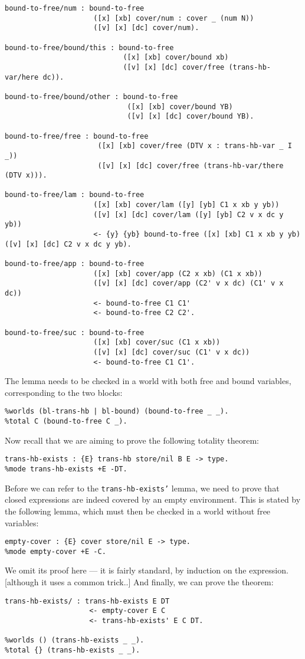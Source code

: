 \begin{verbatim}
bound-to-free/num : bound-to-free
                     ([x] [xb] cover/num : cover _ (num N))
                     ([v] [x] [dc] cover/num).

bound-to-free/bound/this : bound-to-free
                            ([x] [xb] cover/bound xb)
                            ([v] [x] [dc] cover/free (trans-hb-var/here dc)).

bound-to-free/bound/other : bound-to-free
                             ([x] [xb] cover/bound YB)
                             ([v] [x] [dc] cover/bound YB).

bound-to-free/free : bound-to-free
                      ([x] [xb] cover/free (DTV x : trans-hb-var _ I _))
                      ([v] [x] [dc] cover/free (trans-hb-var/there (DTV x))).

bound-to-free/lam : bound-to-free
                     ([x] [xb] cover/lam ([y] [yb] C1 x xb y yb))
                     ([v] [x] [dc] cover/lam ([y] [yb] C2 v x dc y yb))
                     <- {y} {yb} bound-to-free ([x] [xb] C1 x xb y yb) ([v] [x] [dc] C2 v x dc y yb).

bound-to-free/app : bound-to-free
                     ([x] [xb] cover/app (C2 x xb) (C1 x xb))
                     ([v] [x] [dc] cover/app (C2' v x dc) (C1' v x dc))
                     <- bound-to-free C1 C1'
                     <- bound-to-free C2 C2'.

bound-to-free/suc : bound-to-free
                     ([x] [xb] cover/suc (C1 x xb))
                     ([v] [x] [dc] cover/suc (C1' v x dc))
                     <- bound-to-free C1 C1'.
\end{verbatim}
The lemma needs to be checked in a world with both free and bound variables, corresponding to the two blocks:
\begin{verbatim}
%worlds (bl-trans-hb | bl-bound) (bound-to-free _ _).
%total C (bound-to-free C _).
\end{verbatim}

Now recall that we are aiming to prove the following totality theorem:
\begin{verbatim}
trans-hb-exists : {E} trans-hb store/nil B E -> type.
%mode trans-hb-exists +E -DT.
\end{verbatim}
Before we can refer to the \texttt{trans-hb-exists'} lemma, we need to prove that closed expressions are indeed covered by an empty environment.
This is stated by the following lemma, which must then be checked in a world without free variables:
\begin{verbatim}
empty-cover : {E} cover store/nil E -> type.
%mode empty-cover +E -C.
\end{verbatim}
We omit its proof here --- it is fairly standard, by induction on the expression.
[although it uses a common trick..]
And finally, we can prove the theorem:
\begin{verbatim}
trans-hb-exists/ : trans-hb-exists E DT
                    <- empty-cover E C
                    <- trans-hb-exists' E C DT.

%worlds () (trans-hb-exists _ _).
%total {} (trans-hb-exists _ _).
\end{verbatim}


